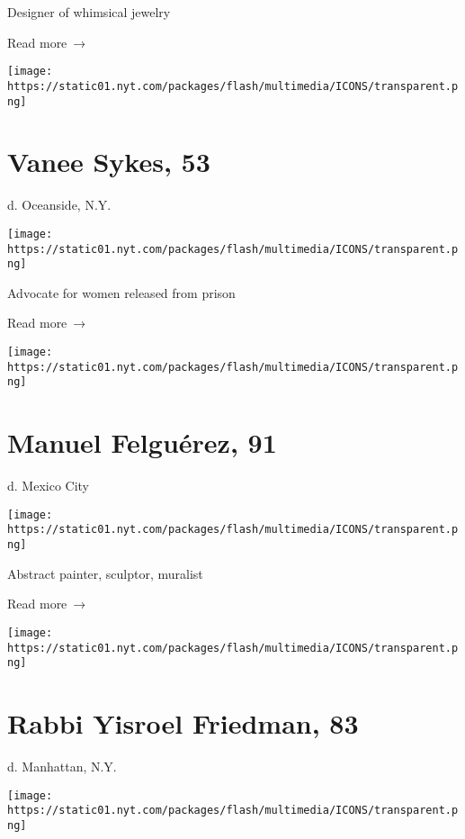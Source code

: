 Designer of whimsical jewelry

 Read more~→

\href{https://www.nytimes.com/2020/06/17/obituaries/vanee-skyes-dead-coronavirus.html}{}

\texttt{[image: https://static01.nyt.com/packages/flash/multimedia/ICONS/transparent.png]}

\hypertarget{vanee-sykes-53}{%
\section{Vanee Sykes, 53}\label{vanee-sykes-53}}

d. Oceanside, N.Y.

\texttt{[image: https://static01.nyt.com/packages/flash/multimedia/ICONS/transparent.png]}

Advocate for women released from prison

 Read more~→

\href{https://www.nytimes.com/2020/06/17/arts/manuel-felguerez-dead-coronavirus.html}{}

\texttt{[image: https://static01.nyt.com/packages/flash/multimedia/ICONS/transparent.png]}

\hypertarget{manuel-felguuxe9rez-91}{%
\section{Manuel Felguérez, 91}\label{manuel-felguuxe9rez-91}}

d. Mexico City

\texttt{[image: https://static01.nyt.com/packages/flash/multimedia/ICONS/transparent.png]}

Abstract painter, sculptor, muralist

 Read more~→

\href{https://www.nytimes.com/2020/06/16/obituaries/rabbi-friedman-dead-coronavirus.html}{}

\texttt{[image: https://static01.nyt.com/packages/flash/multimedia/ICONS/transparent.png]}

\hypertarget{rabbi-yisroel-friedman-83}{%
\section{Rabbi Yisroel Friedman, 83}\label{rabbi-yisroel-friedman-83}}

d. Manhattan, N.Y.

\texttt{[image: https://static01.nyt.com/packages/flash/multimedia/ICONS/transparent.png]}

